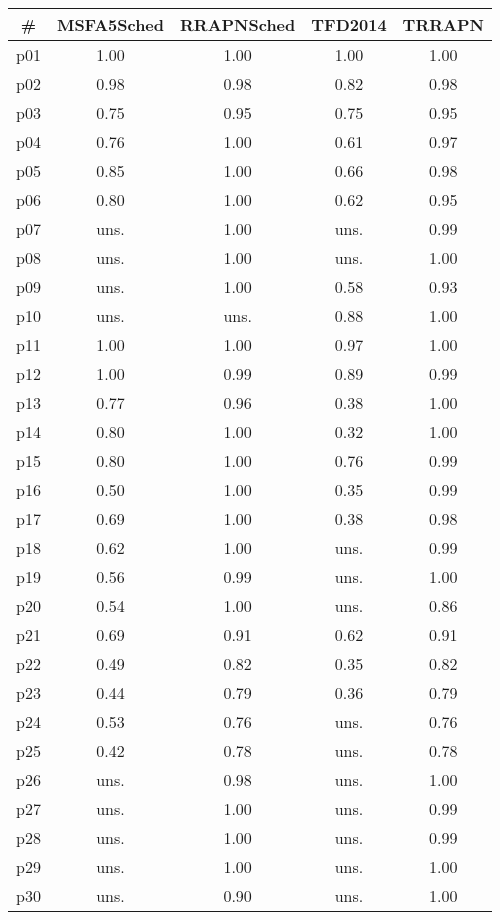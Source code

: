 \begin{tabular}{c||c|c|c|c}
\textbf{\#} & \textbf{MSFA5Sched} & \textbf{RRAPNSched} & \textbf{TFD2014} & \textbf{TRRAPN}\\
\hline
\hline
p01 & 1.00 & 1.00 & 1.00 & 1.00\\
p02 & 0.98 & 0.98 & 0.82 & 0.98\\
p03 & 0.75 & 0.95 & 0.75 & 0.95\\
p04 & 0.76 & 1.00 & 0.61 & 0.97\\
p05 & 0.85 & 1.00 & 0.66 & 0.98\\
p06 & 0.80 & 1.00 & 0.62 & 0.95\\
p07 & uns. & 1.00 & uns. & 0.99\\
p08 & uns. & 1.00 & uns. & 1.00\\
p09 & uns. & 1.00 & 0.58 & 0.93\\
p10 & uns. & uns. & 0.88 & 1.00\\
p11 & 1.00 & 1.00 & 0.97 & 1.00\\
p12 & 1.00 & 0.99 & 0.89 & 0.99\\
p13 & 0.77 & 0.96 & 0.38 & 1.00\\
p14 & 0.80 & 1.00 & 0.32 & 1.00\\
p15 & 0.80 & 1.00 & 0.76 & 0.99\\
p16 & 0.50 & 1.00 & 0.35 & 0.99\\
p17 & 0.69 & 1.00 & 0.38 & 0.98\\
p18 & 0.62 & 1.00 & uns. & 0.99\\
p19 & 0.56 & 0.99 & uns. & 1.00\\
p20 & 0.54 & 1.00 & uns. & 0.86\\
p21 & 0.69 & 0.91 & 0.62 & 0.91\\
p22 & 0.49 & 0.82 & 0.35 & 0.82\\
p23 & 0.44 & 0.79 & 0.36 & 0.79\\
p24 & 0.53 & 0.76 & uns. & 0.76\\
p25 & 0.42 & 0.78 & uns. & 0.78\\
p26 & uns. & 0.98 & uns. & 1.00\\
p27 & uns. & 1.00 & uns. & 0.99\\
p28 & uns. & 1.00 & uns. & 0.99\\
p29 & uns. & 1.00 & uns. & 1.00\\
p30 & uns. & 0.90 & uns. & 1.00\\
\end{tabular}

